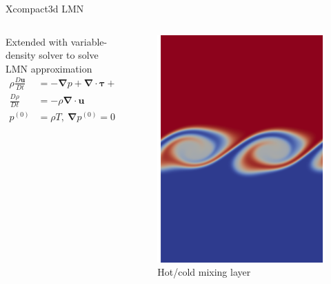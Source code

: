 \documentclass[presentation]{beamer}
\begin{document}
\begin{frame}[label={sec:org772d5ba}]{Xcompact3d LMN}
\begin{columns}
\begin{column}{0.5\columnwidth}
Extended with variable-density solver to solve LMN approximation \cite{Bartholomew2019}
\begin{align*}
  \rho \frac{D\boldsymbol{u}}{Dt} &= -\boldsymbol{\nabla} p +
                                    \boldsymbol{\nabla}\cdot\boldsymbol{\tau} + \rho\boldsymbol{g}
  \\
  \frac{D\rho}{Dt} &= -\rho\boldsymbol{\nabla}\cdot\boldsymbol{u} \\
  p^{\left(0\right)} &= \rho T,\ \boldsymbol{\nabla} p^{\left(0\right)} = 0
\end{align*}
\end{column}

\begin{column}{0.5\columnwidth}
\begin{figure}[htbp]
\centering
\includegraphics[width=0.7\columnwidth]{./figures/mixlayer.png}
\caption{Hot/cold mixing layer}
\end{figure}
\end{column}
\end{columns}
\end{frame}
\end{document}
